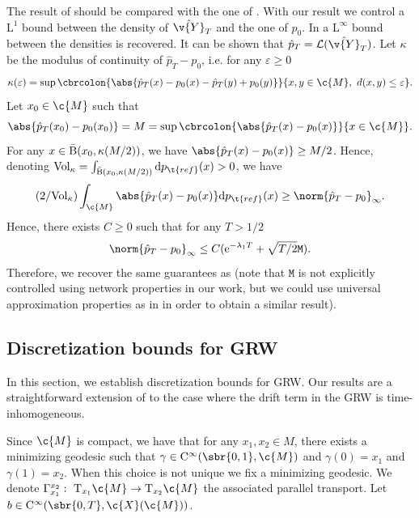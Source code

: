 The result of  should be compared with the one of \cite[Theorem 3]{rozen2021moser}.
With our result we control a \(\mathrm{L}^1\) bound between the density of \(\hat{\v{Y}}_T\) and the one of \(p_0\).
In \cite[Theorem 3]{rozen2021moser} a \(\mathrm{L}^\infty\) bound between the densities is recovered.
It can be shown that \(\hat{p}_T = \mathcal{L}(\hat{\v{Y}}_T)\).
Let \(\kappa\) be the modulus of continuity of \(\hat{p}_T - p_0\), i.e. for any \(\varepsilon \geq 0\) \begin{equation} \kappa(\varepsilon) = \sup \cbrcolon{\abs{\hat{p}_T(x) - p_0(x) - \hat{p}_T(y) + p_0(y)}}{x, y \in \c{M}, \ d(x,y) \leq \varepsilon} .
\end{equation}
Let \(x_0 \in \c{M}\) such that \begin{equation} \abs{\hat{p}_T(x_0) - p_0(x_0)} = M = \sup \cbrcolon{\abs{\hat{p}_T(x) - p_0(x)}}{x \in \c{M}} .
\end{equation}
For any \(x \in \bar{\operatorname{B}}(x_0,\kappa(M/2))\), we have \(\abs{\hat{p}_T(x) - p_0(x)} \geq M/2\).
Hence, denoting \(\mathrm{Vol}_\kappa = \int_{\cball{x_0}{\kappa(M/2)}} \mathrm{d} p_{\t{ref}}(x) > 0\), we have \begin{equation} { (2/\mathrm{Vol}_\kappa) \int_{\c{M}} \abs{\hat{p}_T(x) - p_0(x)} \mathrm{d} p_{\t{ref}}(x) \geq \norm{\hat{p}_T - p_0}_\infty.
	}
\end{equation}
Hence, there exists \(C \geq 0\) such that for any \(T > 1/2\) \begin{equation} \norm{\hat{p}_T - p_0}_\infty \leq C ( \mathrm{e}^{-\lambda_1 T} + \sqrt{T/2} \mathtt{M} ) .
\end{equation}
Therefore, we recover the same guarantees as  (note that \(\mathtt{M}\) is not explicitly controlled using network properties in our work, but we could use universal approximation properties as in \textcite{rozen2021moser} in order to obtain a similar result).

\subsection{Discretization bounds for GRW}
\label{sec:discr-bounds-grw}

In this section, we establish discretization bounds for GRW.
Our results are a straightforward extension of \textcite{cheng2022theorymanifold} to the case where the drift term in the GRW is time-inhomogeneous.

Since \(\c{M}\) is compact, we have that for any \(x_1, x_2 \in M\), there exists a minimizing geodesic such that \(\gamma \in \mathrm{C}^\infty(\sbr{0,1}, \c{M})\) and \(\gamma(0) = x_1\) and \(\gamma(1) = x_2\).
When this choice is not unique we fix a minimizing geodesic.
We denote \(\Gamma_{x_1}^{x_2}: \ \mathrm{T}_{x_1} \c{M} \to \mathrm{T}_{x_2} \c{M}\) the associated parallel transport.
Let \(b \in \mathrm{C}^\infty(\sbr{0,T}, \c{X}(\c{M}))\).

